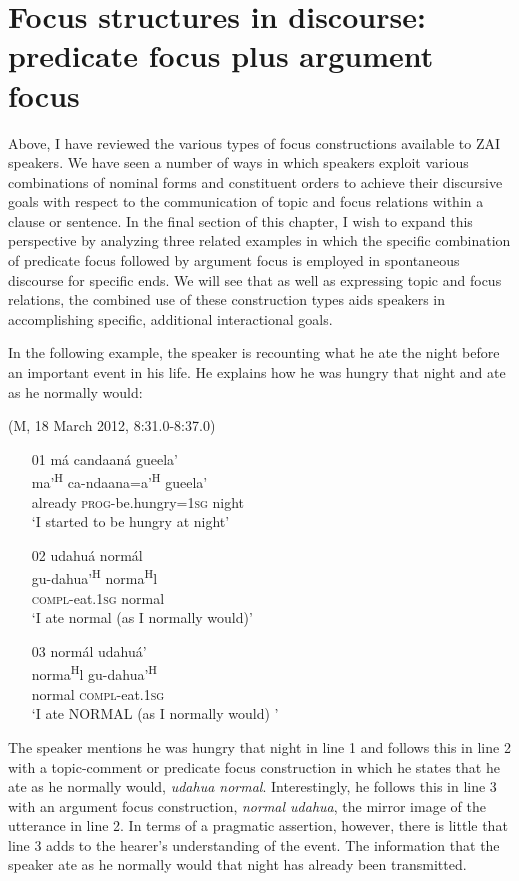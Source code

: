 \section{Focus structures in discourse: predicate focus plus argument focus}\label{chiasmus}

Above, I have reviewed the various types of focus constructions available to ZAI speakers. We have seen a number of ways in which speakers exploit various combinations of nominal forms and constituent orders to achieve their discursive goals with respect to the communication of topic and focus relations within a clause or sentence. In the final section of this chapter, I wish to expand this perspective by analyzing three related examples in which the specific combination of predicate focus followed by argument focus is employed in spontaneous discourse for specific ends. We will see that as well as expressing topic and focus relations, the combined use of these construction types aids speakers in accomplishing specific, additional interactional goals. 

In the following example, the speaker is recounting what he ate the night before an important event in his life. He explains how he was hungry that night and ate as he normally would:

\ea (M, 18 March 2012, 8:31.0-8:37.0)
\begin{itemize}

\item[01] 
\glll m\'{a} candaan\'{a} gueela'  \\
ma'\textsuperscript{H} ca-ndaana=a'\textsuperscript{H} gueela'  \\
already \textsc{prog}-be.hungry=\textsc{1sg} night  \\
\glt `I started to be hungry at night'



\item[02] 
\glll udahu\'{a} norm\'{a}l  \\
 gu-dahua'\textsuperscript{H} norma\textsuperscript{H}l  \\
\textsc{compl}-eat.\textsc{1sg} normal  \\
\glt `I ate normal (as I normally would)'


\item[03] 
\glll norm\'{a}l udahu\'{a}'  \\
norma\textsuperscript{H}l gu-dahua'\textsuperscript{H}  \\
normal \textsc{compl}-eat.\textsc{1sg}  \\
\glt `I ate NORMAL (as I normally would) '

\end{itemize}
\z
The speaker mentions he was hungry that night in line 1 and follows this in line 2 with a topic-comment or predicate focus construction in which he states that he ate as he normally would, \textit{udahua normal}. Interestingly, he follows this in line 3 with an argument focus construction, \textit{normal udahua}, the mirror image of the utterance in line 2. In terms of a pragmatic assertion, however, there is little that line 3 adds to the hearer's understanding of the event. The information that the speaker ate as he normally would that night has already been transmitted. 

